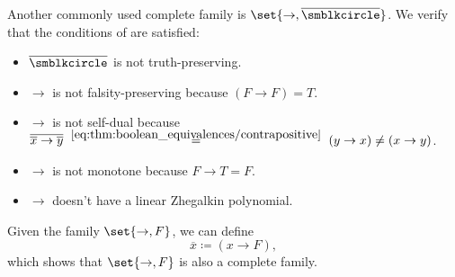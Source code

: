 \begin{example}
\begin{thmenum}
     Another commonly used complete family is \( \set{ \rightarrow, \overline{\anon} } \).
    We verify that the conditions of  are satisfied:
    \begin{itemize}
      \item \( \overline{\anon} \) is not truth-preserving.
      \item \( \rightarrow \) is not falsity-preserving because \( (F \rightarrow F) = T \).
      \item \( \rightarrow \) is not self-dual because \( \overline{\overline{x} \rightarrow \overline{y}} \reloset {\eqref{eq:thm:boolean_equivalences/contrapositive}} = (y \rightarrow x) \neq (x \rightarrow y) \).
      \item \( \rightarrow \) is not monotone because \( F \rightarrow T = F \).
      \item \( \rightarrow \) doesn't have a linear Zhegalkin polynomial.
    \end{itemize}

     Given the family \( \set{ \rightarrow, F } \), we can define
    \begin{equation*}
      \overline{x} \coloneqq (x \rightarrow F),
    \end{equation*}
    which shows that \( \set{ \rightarrow, F } \) is also a complete family.
  \end{thmenum}
\end{example}
